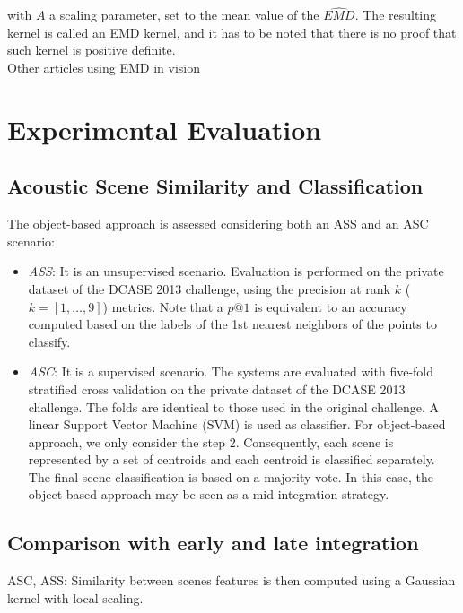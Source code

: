 \documentclass[journal]{IEEEtran}
\begin{document}
with $A$ a scaling parameter, set to the mean value of the $\widehat{EMD}$. The resulting kernel is called an EMD kernel, and it has to be noted that there is no proof that such kernel is positive definite. \\

Other articles using EMD in vision \cite{zhang2007local}

\section{Experimental Evaluation}

\subsection{Acoustic Scene Similarity and Classification}

The object-based approach is assessed considering both an ASS and an ASC scenario:

\begin{itemize}
\item \emph{ASS}: It is an unsupervised scenario. Evaluation is performed on the private dataset of the DCASE 2013 challenge, using the precision at rank $k$ ($k=[1,\ldots,9]$) metrics. Note that a $p@1$ is equivalent to an accuracy computed based on the labels of the 1st nearest neighbors of the points to classify.

\item \emph{ASC}: It is a supervised scenario. The systems are evaluated  with five-fold  stratified cross validation on the  private dataset of the DCASE 2013 challenge. The folds are identical to those used in the original challenge. A linear Support Vector Machine (SVM) is used as classifier. For object-based approach, we only consider the step 2. Consequently, each scene is represented by a set of centroids and each centroid is classified separately. The final scene classification is based on a majority vote. In this case, the object-based approach may be seen as a mid integration strategy.
\end{itemize}

\subsection{Comparison with early and late integration}

ASC, ASS:   Similarity between scenes features is then computed using a Gaussian kernel with local scaling. 
\end{document}
